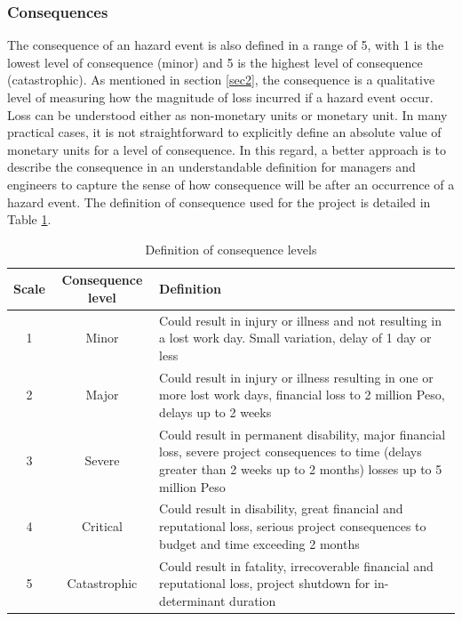 \documentclass[10pt,halfline,a4paper]{ouparticle}
\begin{document}
\subsubsection{Consequences} \label{cons}
The consequence of an hazard event is also defined in a range of 5, with 1 is the lowest level of consequence (minor) and 5 is the highest level of consequence (catastrophic). As mentioned in section \ref{sec2}, the consequence is a qualitative level of measuring how the magnitude of loss incurred if a hazard event occur. Loss can be understood either as non-monetary units or monetary unit. In many practical cases, it is not straightforward to explicitly define an absolute value of monetary units for a level of consequence. In this regard, a better approach is to describe the consequence in an understandable definition for managers and engineers to capture the sense of how consequence will be after an occurrence of a hazard event. The definition of consequence used for the project is detailed in Table \ref{tbl_consequences}.

\begin{table}
	\centering
	\caption{Definition of consequence levels}
	\begin{tabular}{l|p{2cm}|p{10cm}}
		\hline
		\multicolumn{1}{c|}{Scale} & \multicolumn{1}{c|}{Consequence level} & Definition \\ 
		\hline
		\multicolumn{1}{c|}{1} & \multicolumn{1}{c|}{Minor} & Could result in injury or illness and not resulting in a lost work day. Small variation, delay of 1 day or less \\ 
		\multicolumn{1}{c|}{2} & \multicolumn{1}{c|}{Major} & Could result in injury or illness resulting in one or more lost work days, financial loss to 2 million Peso, delays up to 2 weeks \\ 
		\multicolumn{1}{c|}{3} & \multicolumn{1}{c|}{Severe} & Could result in permanent disability, major financial loss, severe project consequences to time (delays greater than 2 weeks up to 2 months) losses up to 5 million Peso \\ 
		\multicolumn{1}{c|}{4} & \multicolumn{1}{c|}{Critical} & Could result in disability, great financial and reputational loss, serious project consequences to budget and time exceeding 2 months \\ 
		\multicolumn{1}{c|}{5} & \multicolumn{1}{c|}{Catastrophic} & Could result in fatality, irrecoverable financial and reputational loss, project shutdown for in-determinant duration \\ 
		\hline
	\end{tabular}
	\label{tbl_consequences}
\end{table}
\end{document}
